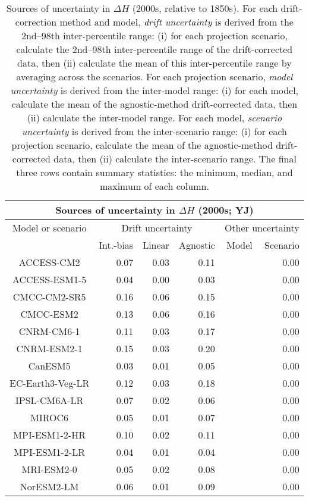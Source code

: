 \begin{table*}[t]
\centering
\caption{Sources of uncertainty in $\Delta H$ (2000s, relative to 1850s). For each drift-correction method and model, \emph{drift uncertainty} is derived from the 2nd--98th inter-percentile range: (i) for each projection scenario, calculate the 2nd--98th inter-percentile range of the drift-corrected data, then (ii) calculate the mean of this inter-percentile range by averaging across the scenarios. For each projection scenario, \emph{model uncertainty} is derived from the inter-model range: (i) for each model, calculate the mean of the agnostic-method drift-corrected data, then (ii) calculate the inter-model range. For each model, \emph{scenario uncertainty} is derived from the inter-scenario range: (i) for each projection scenario, calculate the mean of the agnostic-method drift-corrected data, then (ii) calculate the inter-scenario range. The final three rows contain summary statistics: the minimum, median, and maximum of each column.}
\begin{tabular}{c|rrr|rr}
\toprule
\multicolumn{6}{c}{Sources of uncertainty in $\Delta H$ (2000s; YJ)} \\ 
\midrule
Model or scenario & \multicolumn{3}{c|}{Drift uncertainty} & \multicolumn{2}{c}{Other uncertainty} \\
 & Int.-bias & Linear & Agnostic & Model & Scenario \\
\midrule
ACCESS-CM2 & 0.07 & 0.03 & 0.11 &  & 0.00 \\
ACCESS-ESM1-5 & 0.04 & 0.00 & 0.03 &  & 0.00 \\
CMCC-CM2-SR5 & 0.16 & 0.06 & 0.15 &  & 0.00 \\
CMCC-ESM2 & 0.13 & 0.06 & 0.16 &  & 0.00 \\
CNRM-CM6-1 & 0.11 & 0.03 & 0.17 &  & 0.00 \\
CNRM-ESM2-1 & 0.15 & 0.03 & 0.20 &  & 0.00 \\
CanESM5 & 0.03 & 0.01 & 0.05 &  & 0.00 \\
EC-Earth3-Veg-LR & 0.12 & 0.03 & 0.18 &  & 0.00 \\
IPSL-CM6A-LR & 0.07 & 0.02 & 0.06 &  & 0.00 \\
MIROC6 & 0.05 & 0.01 & 0.07 &  & 0.00 \\
MPI-ESM1-2-HR & 0.10 & 0.02 & 0.11 &  & 0.00 \\
MPI-ESM1-2-LR & 0.04 & 0.01 & 0.04 &  & 0.00 \\
MRI-ESM2-0 & 0.05 & 0.02 & 0.08 &  & 0.00 \\
NorESM2-LM & 0.06 & 0.01 & 0.09 &  & 0.00 \\

\end{tabular}
\end{table*}
